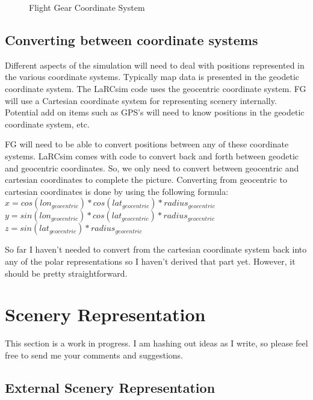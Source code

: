 \documentclass[12pt]{article}
\begin{document}
\begin{figure}[hbt]
  \centerline{                   
  }
  \caption{Flight Gear Coordinate System}
  \label{fig:coords}
\end{figure}

\newpage

\subsection{Converting between coordinate systems}

Different aspects of the simulation will need to deal with positions
represented in the various coordinate systems.  Typically map data is
presented in the geodetic coordinate system.  The LaRCsim code uses
the geocentric coordinate system.  FG will use a Cartesian coordinate
system for representing scenery internally.  Potential add on items
such as GPS's will need to know positions in the geodetic coordinate
system, etc.

FG will need to be able to convert positions between any of these
coordinate systems.  LaRCsim comes with code to convert back and forth
between geodetic and geocentric coordinates.  So, we only need to
convert between geocentric and cartesian coordinates to complete the
picture.  Converting from geocentric to cartesian coordinates is done
by using the following formula:  \\
$x = cos(lon_\mathit{geocentric}) * cos(lat_\mathit{geocentric}) *
radius_\mathit{geocentric}$  \\
$y = sin(lon_\mathit{geocentric}) * cos(lat_\mathit{geocentric}) *
radius_\mathit{geocentric}$ \\
$z = sin(lat_\mathit{geocentric}) * radius_\mathit{geocentric}$

So far I haven't needed to convert from the cartesian coordinate
system back into any of the polar representations so I haven't derived
that part yet.  However, it should be pretty straightforward.


\section{Scenery Representation}

This section is a work in progress.  I am hashing out ideas as I
write, so please feel free to send me your comments and suggestions.

\subsection{External Scenery Representation}
\end{document}
